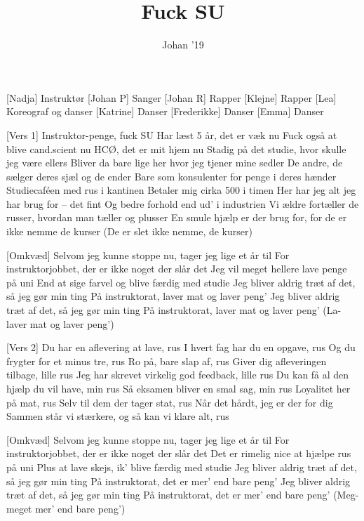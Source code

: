 \documentclass[a4paper,11pt]{article}
\title{Fuck SU}
\author{Johan '19}
\begin{document}
\maketitle

\begin{roles}
[Nadja] Instruktør
[Johan P] Sanger
[Johan R] Rapper 
[Klejne] Rapper 
[Lea] Koreograf og danser
[Katrine] Danser
[Frederikke] Danser
[Emma] Danser
\end{roles}

\begin{song}

[Vers 1] Instruktor-penge, fuck SU
Har læst 5 år, det er væk nu
Fuck også at blive cand.scient nu
HCØ, det er mit hjem nu
Stadig på det studie, hvor skulle jeg være ellers
Bliver da bare lige her hvor jeg tjener mine sedler
De andre, de sælger deres sjæl og de ender
Bare som konsulenter for penge i deres hænder
Studiecaféen med rus i kantinen
Betaler mig cirka 500 i timen
Her har jeg alt jeg har brug for – det fint
Og bedre forhold end ud’ i industrien
Vi ældre fortæller de russer, hvordan man tæller og plusser
En smule hjælp er der brug for, for de er ikke nemme de kurser
(De er slet ikke nemme, de kurser)

[Omkvæd] Selvom jeg kunne stoppe nu, tager jeg lige et år til
For instruktorjobbet, der er ikke noget der slår det
Jeg vil meget hellere lave penge på uni
End at sige farvel og blive færdig med studie
Jeg bliver aldrig træt af det, så jeg gør min ting
På instruktorat, laver mat og laver peng’
Jeg bliver aldrig træt af det, så jeg gør min ting
På instruktorat, laver mat og laver peng’
(La-laver mat og laver peng’)

[Vers 2] Du har en aflevering at lave, rus
I hvert fag har du en opgave, rus
Og du frygter for et minus tre, rus
Ro på, bare slap af, rus
Giver dig afleveringen tilbage, lille rus
Jeg har skrevet virkelig god feedback, lille rus
Du kan få al den hjælp du vil have, min rus
Så eksamen bliver en smal sag, min rus
Loyalitet her på mat, rus
Selv til dem der tager stat, rus
Når det hårdt, jeg er der for dig
Sammen står vi stærkere, og så kan vi klare alt, rus

[Omkvæd] Selvom jeg kunne stoppe nu, tager jeg lige et år til
For instruktorjobbet, der er ikke noget der slår det
Det er rimelig nice at hjælpe rus på uni
Plus at lave skejs, ik' blive færdig med studie
Jeg bliver aldrig træt af det, så jeg gør min ting
På instruktorat, det er mer' end bare peng’
Jeg bliver aldrig træt af det, så jeg gør min ting
På instruktorat, det er mer' end bare peng’
(Meg- meget mer' end bare peng’)


\end{song}
\end{document}
